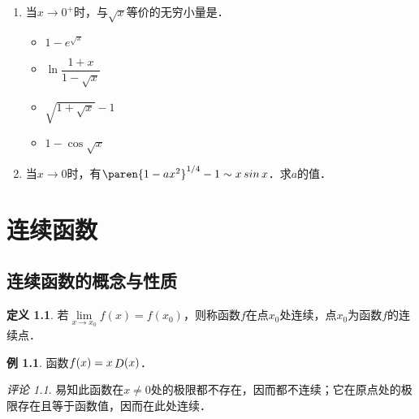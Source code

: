 \documentclass[a4paper,punct=CCT]{ctexbook}
\theoremstyle{definition}
\newtheorem{definition}{定义}
\newtheorem*{example*}{例}
\theoremstyle{remark}
\newtheorem*{remark}{评论}
\newif\ifshowsol
\begin{document}
\begin{enumerate}
\item 当\(x \to 0^+\)时，与\(\sqrt x\)等价的无穷小量是\uline{\makebox[6em]{}}．
  \begin{itemize}
    \renewcommand{\labelitemi}{\faCircleThin}
  \item \(1 - e^{\sqrt x}\)
    \ifshowsol
  \item[\faCircle]
    \else
  \item
    \fi
    \(\ln \dfrac{1+x}{1-\sqrt x}\)\rule[-2ex]{0ex}{5ex}
  \item \(\sqrt{1 + \sqrt x} - 1\)
  \item \(1 - \cos\sqrt x\)
  \end{itemize}

  \ifshowsol
  实际上，有
  \begin{equation*}
    1 - e^{\sqrt x} \sim -\sqrt x, \quad
    \ln \dfrac{1+x}{1-\sqrt x} \sim \sqrt x, \quad
    \sqrt{1 + \sqrt x} - 1 \sim \frac{\sqrt x}{2}, \quad
    1 - \cos\sqrt x \sim \frac x2.
  \end{equation*}
  \fi

\item 当\(x \to 0\)时，有\(\paren{1-ax^2}^{1/4} - 1 \sim x \sin x\)．求\(a\)的值．

  \ifshowsol
  因为\(x \sin x \sim x^2\)和\(\paren{1-ax^2}^{1/4} - 1 \sim -ax^2/4\)，所以有\(a = 4\)．
  \fi
\end{enumerate}
\fi

\chapter{连续函数\label{chap:cont}}

\section{连续函数的概念与性质}

\begin{definition}
  \label{defn:cont}
  若\(\lim\limits_{x\to x_0} f(x) = f(x_0)\)，则称函数\(f\)在点\(x_0\)处连续，点\(x_0\)为函数\(f\)的连续点．
\end{definition}

\begin{example*}
  函数\(f(x) = x \mathop{\relax D}\nolimits(x)\)．

  \begin{remark}
    易知此函数在\(x \ne 0\)处的极限都不存在，因而都不连续；它在原点处的极限存在且等于函数值，因而在此处连续．
  \end{remark}
\end{example*}
\end{document}
